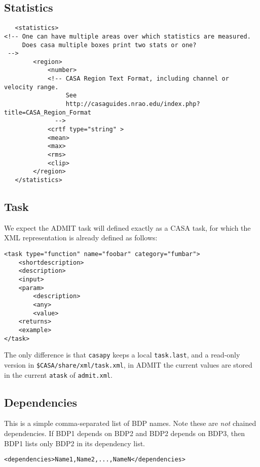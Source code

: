 \documentclass{article}
\begin{document}
\subsection{Statistics}
\begin{verbatim}
   <statistics>
<!-- One can have multiple areas over which statistics are measured.
     Does casa multiple boxes print two stats or one?
 -->
        <region>
            <number>
            <!-- CASA Region Text Format, including channel or velocity range. 
                 See 
                 http://casaguides.nrao.edu/index.php?title=CASA_Region_Format
              -->
            <crtf type="string" >
            <mean>
            <max>
            <rms>
            <clip>
        </region>
   </statistics>
\end{verbatim}
\normalsize

\subsection{Task}
We expect the ADMIT task will defined exactly as a CASA task, for which the XML
representation is already defined as follows:

\footnotesize
\begin{verbatim}
<task type="function" name="foobar" category="fumbar">
    <shortdescription>
    <description>
    <input>
    <param>
        <description>
        <any>
        <value>
    <returns>
    <example>
</task>  
\end{verbatim}
\normalsize

\noindent
The only difference is that {\tt casapy} keeps a local {\tt task.last},
and a read-only version in {\tt \$CASA/share/xml/task.xml}, in ADMIT the
current values are stored in the current {\tt atask} of {\tt admit.xml}.


\subsection{Dependencies}
This is a simple comma-separated list of BDP names. Note
these are {\em not} chained dependencies. If BDP1 depends
on BDP2 and BDP2 depends on BDP3, then BDP1 lists only BDP2
in its dependency list.
\footnotesize
\begin{verbatim}
<dependencies>Name1,Name2,...,NameN</dependencies>
\end{verbatim}
\normalsize
%
%
%
%
%
%
%
%
%
%        
\end{document}
